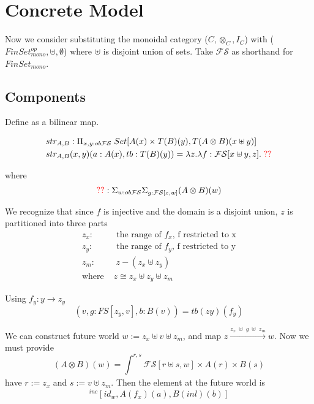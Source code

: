 \documentclass{article}
\newcommand{\red}[1]{\textcolor{red}{#1}}
\begin{document}
\section{Concrete Model}
Now we consider substituting the monoidal category ($C, \otimes_C , I_C$) with ($FinSet_{mono}^{op}, \uplus , \emptyset $)
where $\uplus$ is disjoint union of sets. Take $\mathcal{FS}$ as shorthand for $FinSet_{mono}$. 

\subsection{Components}
Define as a bilinear map.


\begin{align*}
    & str_{A, B} : \Pi_{x,y :ob \mathcal{FS}}\; Set[A(x)\times T(B)(y) , T(A\otimes B)(x \uplus y)] \\
    & str_{A, B} (x , y)(a : A(x), tb :T(B)(y))=\lambda z . \lambda f: \mathcal{FS}[x \uplus y , z].\; \red{??} 
\end{align*}

where 
\[
    \red{??}: \Sigma_{w : ob \mathcal{FS}}\Sigma_{g : \mathcal{FS}[z , w]}(A\otimes B)(w)
\]

We recognize that since $f$ is injective and the domain is a disjoint union, $z$ is partitioned into three parts
\begin{align*}
    z_x :& \textrm{ the range of $f_x$, f restricted to x}\\
    z_y :& \textrm{ the range of $f_y$, f restricted to y}\\
    z_m :& \; z - (z_x \uplus z_y)\\
    \textrm{where } & z \cong z_x \uplus z_y \uplus z_m
\end{align*}


Using $f_y : y \rightarrow z_y$
\[
  (v , g : FS[z_y , v], b : B(v)) = tb(zy)(f_y)  
\]

We can construct future world $w := z_x \uplus v \uplus z_m$, and map $z \xrightarrow{z_x \;\uplus\; g \;\uplus\; z_m} w$.
Now we must provide 
\[
    (A \otimes B)(w) = \int_{}^{r,s} \mathcal{FS}[r \uplus s,w] 
    \times A(r) \times B(s)
\]
have $r := z_x$ and $s := v \uplus z_m$.
Then the element at the future world is 
\[
  ^{inc}[ id_w, A(f_x)(a), B(inl)(b)]
\]
\end{document}
